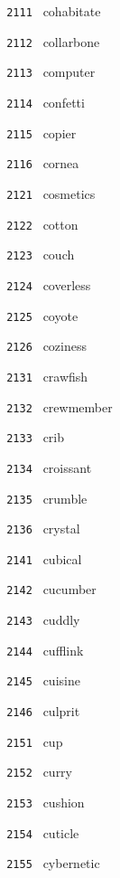 \documentclass[11pt]{article}
\begin{document}
\begin{multicols}{6}
\footnotesize
\noindent \texttt{ 2111 } cohabitate  \par
\noindent \texttt{ 2112 } collarbone  \par
\noindent \texttt{ 2113 } computer  \par
\noindent \texttt{ 2114 } confetti  \par
\noindent \texttt{ 2115 } copier  \par
\noindent \texttt{ 2116 } cornea  \par
\vspace{3mm}
\noindent \texttt{ 2121 } cosmetics  \par
\noindent \texttt{ 2122 } cotton  \par
\noindent \texttt{ 2123 } couch  \par
\noindent \texttt{ 2124 } coverless  \par
\noindent \texttt{ 2125 } coyote  \par
\noindent \texttt{ 2126 } coziness  \par
\vspace{3mm}
\noindent \texttt{ 2131 } crawfish  \par
\noindent \texttt{ 2132 } crewmember  \par
\noindent \texttt{ 2133 } crib  \par
\noindent \texttt{ 2134 } croissant  \par
\noindent \texttt{ 2135 } crumble  \par
\noindent \texttt{ 2136 } crystal  \par
\vspace{3mm}
\noindent \texttt{ 2141 } cubical  \par
\noindent \texttt{ 2142 } cucumber  \par
\noindent \texttt{ 2143 } cuddly  \par
\noindent \texttt{ 2144 } cufflink  \par
\noindent \texttt{ 2145 } cuisine  \par
\noindent \texttt{ 2146 } culprit  \par
\vspace{3mm}
\noindent \texttt{ 2151 } cup  \par
\noindent \texttt{ 2152 } curry  \par
\noindent \texttt{ 2153 } cushion  \par
\noindent \texttt{ 2154 } cuticle  \par
\noindent \texttt{ 2155 } cybernetic  \par

\end{multicols}
\end{document}
